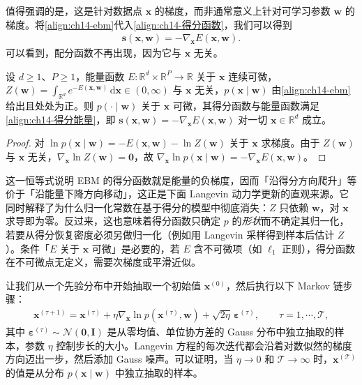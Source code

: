 \documentclass[../../main.tex]{subfiles}
\begin{document}
值得强调的是，这是针对数据点 $\bm{x}$ 的梯度，而非通常意义上针对可学习参数 $\bm{w}$ 的梯度。将\eqref{align:ch14-ebm}代入\eqref{align:ch14-得分函数}，我们可以得到
\begin{align}
\bm{s}(\bm{x},\bm{w})=-\nabla_{\bm{x}}E(\bm{x},\bm{w}).
\label{align:ch14-得分能量}
\end{align}
可以看到，配分函数不再出现，因为它与 $\bm{x}$ 无关。

\begin{proposition}[得分函数与能量函数]\label{proposition:ch14-得分与能量}
设 $d\geqslant1$、$P\geqslant1$，能量函数 $E:\mathbb{R}^{d}\times\mathbb{R}^{P}\to\mathbb{R}$ 关于 $\bm{x}$ 连续可微，$Z(\bm{w})=\int_{\mathbb{R}^{d}}e^{-E(\bm{x},\bm{w})}\,\mathrm{d}\bm{x}\in(0,\infty)$ 与 $\bm{x}$ 无关，$p(\bm{x}\mid\bm{w})$ 由\eqref{align:ch14-ebm}给出且处处为正。则 $p(\cdot\mid\bm{w})$ 关于 $\bm{x}$ 可微，其得分函数与能量函数满足\eqref{align:ch14-得分能量}，即 $\bm{s}(\bm{x},\bm{w})=-\nabla_{\bm{x}}E(\bm{x},\bm{w})$ 对一切 $\bm{x}\in\mathbb{R}^{d}$ 成立。
\end{proposition}

\begin{proof}
对 $\ln p(\bm{x}\mid\bm{w})=-E(\bm{x},\bm{w})-\ln Z(\bm{w})$ 关于 $\bm{x}$ 求梯度。由于 $Z(\bm{w})$ 与 $\bm{x}$ 无关，$\nabla_{\bm{x}}\ln Z(\bm{w})=\bm{0}$，故 $\nabla_{\bm{x}}\ln p(\bm{x}\mid\bm{w})=-\nabla_{\bm{x}}E(\bm{x},\bm{w})$。
\end{proof}

\begin{remark}这一恒等式说明 EBM 的得分函数就是能量的负梯度，因而「沿得分方向爬升」等价于「沿能量下降方向移动」，这正是下面 Langevin 动力学更新的直观来源。它同时解释了为什么归一化常数在基于得分的模型中彻底消失：$Z$ 只依赖 $\bm{w}$，对 $\bm{x}$ 求导即为零。反过来，这也意味着得分函数只确定 $p$ 的\emph{形状}而不确定其归一化，若要从得分恢复密度必须另做归一化（例如用 Langevin 采样得到样本后估计 $Z$）。条件「$E$ 关于 $\bm{x}$ 可微」是必要的，若 $E$ 含不可微项（如 $\ell_1$ 正则），得分函数在不可微点无定义，需要次梯度或平滑近似。
\end{remark}

让我们从一个先验分布中开始抽取一个初始值 $\bm{x}^{(0)}$，然后执行以下 Markov 链步骤：
\begin{align}
\bm{x}^{(\tau+1)}=\bm{x}^{(\tau)}+\eta\nabla_{\bm{x}}\ln p\!\left(\bm{x}^{(\tau)},\bm{w}\right)+\sqrt{2\eta}\,\bm{\varepsilon}^{(\tau)},\qquad \tau=1,\cdots,\mathcal{T},
\label{align:ch14-langevin更新}
\end{align}
其中 $\bm{\varepsilon}^{(\tau)}\sim\mathcal{N}(\bm{0},\bm{I})$ 是从零均值、单位协方差的 Gauss 分布中独立抽取的样本，参数 $\eta$ 控制步长的大小。Langevin 方程的每次迭代都会沿着对数似然的梯度方向迈出一步，然后添加 Gauss 噪声。可以证明，当 $\eta\rightarrow0$ 和 $\mathcal{T}\rightarrow\infty$ 时，$\bm{x}^{(\mathcal{T})}$ 的值是从分布 $p(\bm{x}\mid\bm{w})$ 中独立抽取的样本。
\end{document}

